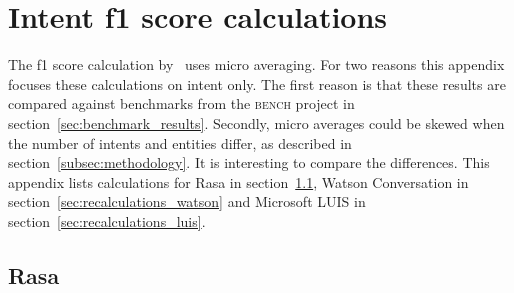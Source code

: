 \chapter{Intent f1 score calculations}
\label{ch:intent_f1_score_calculations}

The f1 score calculation by~\citep{braun2017} uses micro averaging.
For two reasons this appendix focuses these calculations on intent only.
The first reason is that these results are compared against benchmarks from the \textsc{bench} project in section~\ref{sec:benchmark_results}.
Secondly, micro averages could be skewed when the number of intents and entities differ, as described in section~\ref{subsec:methodology}.
It is interesting to compare the differences.
This appendix lists calculations for Rasa in section~\ref{sec:recalculations_rasa}, Watson Conversation in section~\ref{sec:recalculations_watson} and Microsoft LUIS in section~\ref{sec:recalculations_luis}.

\section{Rasa}
\label{sec:recalculations_rasa}
\vspace*{1cm}

